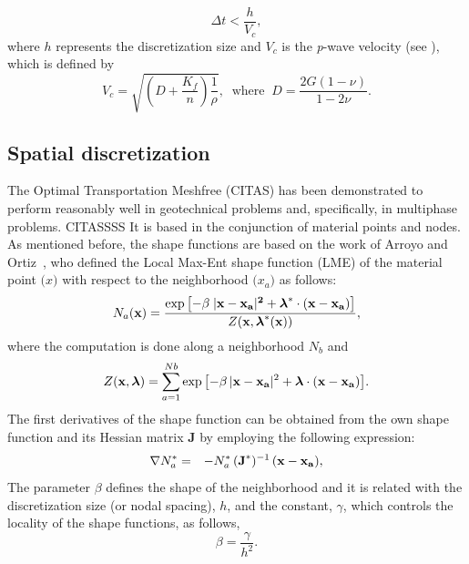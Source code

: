 \documentclass[twocolumn]{svjour3}          %
\begin{document}
  \begin{equation}
\Delta t < \frac{h}{V_c},
\end{equation}
where $h$ represents the discretization size and $V_c$ is the \textit{p}-wave velocity (see \cite{zienkiewicz1980}), which is defined by  
\begin{equation}
V_c=\sqrt{\left( D+\frac{K_f}{n}\right) \frac{1}{\rho}}, \; \; \textrm{where} \;\; D=\frac{2G(1-\nu)}{1-2\nu}.
\end{equation}\label{ex_2}

\subsection{Spatial discretization}
\label{subsec:41}
The Optimal Transportation Meshfree (CITAS) has been demonstrated to perform reasonably well in geotechnical problems and, specifically, in multiphase problems. CITASSSS It is based in the conjunction of material points and nodes. As mentioned before, the shape functions are based on the work of Arroyo and Ortiz~\cite{arroyo2006}, who defined the Local Max-Ent shape function (LME) of the material point $\boldsymbol(x)$ with respect to the neighborhood $\boldsymbol(x_a)$ as follows:
\begin{equation} \label{eq_N1}
N_a(\textbf{x})=\frac{\exp\left[ -\beta \; |\bf x-x_a|^2 +  \boldsymbol{\lambda}^*  \cdot  (x-x_a)  \right] } {Z(\textbf{x},\boldsymbol{\lambda}^*(\textbf{x}))},
\end{equation}
where the computation is done along a neighborhood $N_b$ and 
\begin{equation}\label{eq_N2}
Z({\bf x}, {\boldsymbol{\lambda}}) = \sum_{a=1}^{Nb}{ \exp \left[ -\beta \, |{\bf x-x_a}|^2 + \boldsymbol{\lambda}  \cdot  \bf {(x-x_a)}         \right]}.
\end{equation}
The first derivatives of the shape function can be obtained from the own shape function and its Hessian matrix \textbf{J} by employing the following expression:
\begin{eqnarray}
\nabla N^*_a &=& -N^*_a \,  (\textbf{J}^*)^{-1} \,  (\bf x-x_a) \label{eq_N3} ,
\end{eqnarray}
The parameter $\beta$ defines the shape of the neighborhood and it is related with the discretization size (or nodal spacing), $h$,  and the constant, $\gamma$, which controls the locality of the shape functions, as follows,
\begin{equation}\label{eqLM3}
\beta=\frac{\gamma}{h^2}.
\end{equation} 
\end{document}
